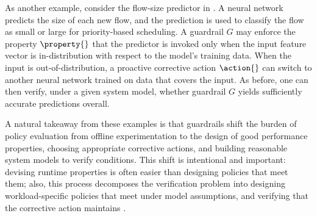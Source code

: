 As another example, consider the flow-size predictor in . A neural network predicts the size of each new flow, and the prediction is used to classify the flow as small or large for priority-based scheduling. A guardrail $G$ may enforce the property $\property{}$ that the predictor is invoked only when the input feature vector is in-distribution with respect to the model’s training data. When the input is out-of-distribution, a proactive corrective action $\action{}$ can switch to another neural network trained on data that covers the input. As before, one can then verify, under a given system model, whether guardrail $G$ yields sufficiently accurate predictions overall.


A natural takeaway from these examples is that guardrails shift the burden of policy evaluation from offline experimentation to the design of good performance properties, choosing appropriate corrective actions, and building reasonable system models to verify \perfsafety conditions.
This shift is intentional and important: devising runtime properties is often easier than designing policies that meet them; also, this process decomposes the verification problem into designing workload-specific policies that meet \perfsafety under model assumptions, and verifying that the corrective action maintains \perfsafety. 


